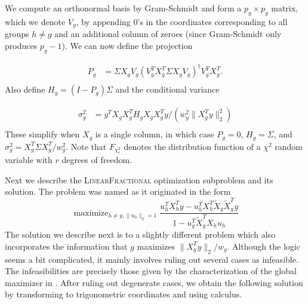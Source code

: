 \documentclass{imsart}
\newcommand{\maximize}{\mathop{\mathrm{maximize}}}
\newcommand{\norm}[1]{\lVert #1 \rVert}
\begin{document}
We compute an orthonormal basis by Gram-Schmidt and form a
$p_g \times p_g$ matrix, which we denote $V_g$, by appending
0's in the coordinates corresponding to all groups $h \neq g$ and
an additional column of zeroes (since Gram-Schmidt only produces $p_g-1$).
We can now define the projection

\begin{equation}
 \begin{aligned}
   \label{eq:proj}
   P_g &= \Sigma X_gV_g (V_g^T X_g^T \Sigma X_g V_g)^\dagger V_g^TX_g^T. \\
  \end{aligned}
\end{equation}
Also define $H_g = (I-P_g)\Sigma$ and the conditional variance

\begin{equation}
 \begin{aligned}
   \label{eq:cvar}
   \sigma^2_g &= y^TX_gX_g^T H_g X_gX_g^Ty / (w_g^2 \norm{X_g^Ty}_2^2) \\
 \end{aligned}
\end{equation}
These simplify when $X_g$ is a single column, in which case $P_g = 0$,
$H_g = \Sigma$, and $\sigma^2_g = X_g^T\Sigma X_g^T/w_g^2$.
Note that $F_{\chi^2_r}$ denotes the distribution function of a $\chi^2$
random variable with $r$ degrees of freedom.

Next we describe the \textsc{LinearFractional} optimization
subproblem and its solution.
The problem was named as it originated in the form
\[
\maximize_{h \neq g, \norm{u_h}_2 = 1}
\frac{u_h^TX_h^Ty - u_h^TX_h^T\tilde X_g \tilde X_g^Ty}
{1 - u_g^T \tilde X_g^TX_hu_h}
\]
The solution we describe next is to a slightly different problem which
also incorporates the information that $g$ maximizes $\norm{X_g^Ty}_2/w_g$.
Although the logic seems a bit complicated, it mainly involves ruling out
several cases as infeasible. The infeasibilities are precisely those given
by the characterization of the global maximizer in \cite{tests:adaptive}.
After ruling out degenerate cases, we obtain the following solution
by transforming to trigonometric coordinates and using calculus.
\end{document}
